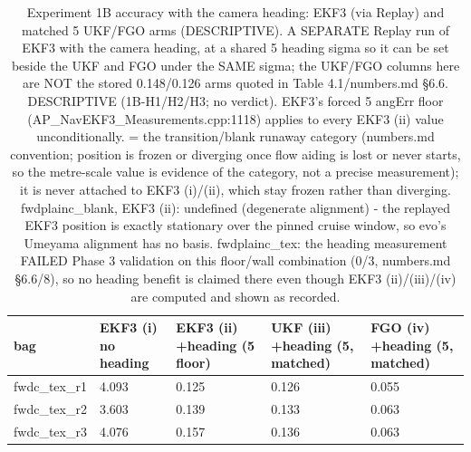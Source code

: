 \begin{table}[htbp]
\centering
\footnotesize
\caption{Experiment 1B accuracy with the camera heading: EKF3 (via Replay) and matched 5\textdegree{} UKF/FGO arms (DESCRIPTIVE). A SEPARATE Replay run of EKF3 with the camera heading, at a shared 5\textdegree{} heading sigma so it can be set beside the UKF and FGO under the SAME sigma; the UKF/FGO columns here are NOT the stored 0.148\textdegree{}/0.126\textdegree{} arms quoted in Table 4.1/numbers.md \S{}6.6. DESCRIPTIVE (1B-H1/H2/H3; no verdict). EKF3's forced 5\textdegree{} angErr floor (AP\_NavEKF3\_Measurements.cpp:1118) applies to every EKF3 (ii) value unconditionally. \textdagger{} = the transition/blank runaway category (numbers.md convention; position is frozen or diverging once flow aiding is lost or never starts, so the metre-scale value is evidence of the category, not a precise measurement); it is never attached to EKF3 (i)/(ii), which stay frozen rather than diverging. fwdplainc\_blank, EKF3 (ii): undefined (degenerate alignment) - the replayed EKF3 position is exactly stationary over the pinned cruise window, so evo's Umeyama alignment has no basis. fwdplainc\_tex: the heading measurement FAILED Phase 3 validation on this floor/wall combination (0/3, numbers.md \S{}6.6/8), so no heading benefit is claimed there even though EKF3 (ii)/(iii)/(iv) are computed and shown as recorded.}
\label{tab:T2B}
\begin{tabular}{p{}p{}p{}p{}p{}}
\toprule
\textbf{bag} & \textbf{EKF3 (i) no heading} & \textbf{EKF3 (ii) +heading (5\textdegree{} floor)} & \textbf{UKF (iii) +heading (5\textdegree{}, matched)} & \textbf{FGO (iv) +heading (5\textdegree{}, matched)} \\
\midrule
fwdc\_tex\_r1 & 4.093 & 0.125 & 0.126 & 0.055 \\
fwdc\_tex\_r2 & 3.603 & 0.139 & 0.133 & 0.063 \\
fwdc\_tex\_r3 & 4.076 & 0.157 & 0.136 & 0.063 \\

\end{tabular}
\end{table}
